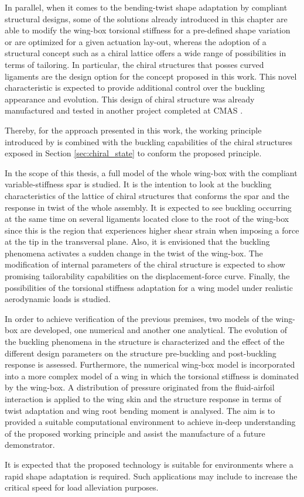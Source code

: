  In parallel, when it comes to the bending-twist shape adaptation by compliant structural designs, some of the solutions already introduced in this chapter are able to modify the wing-box torsional stiffness for a pre-defined shape variation or are optimized for a given actuation lay-out, whereas the adoption of a structural concept such as a chiral lattice offers a wide range of possibilities in terms of tailoring. In particular, the chiral structures that posses curved ligaments are the design option for the concept proposed in this work. This novel characteristic is expected to provide additional control over the buckling appearance and evolution. This design of chiral structure was already manufactured and tested in another project completed at CMAS \cite{Vincenz2017}.

  Thereby, for the approach presented in this work, the working principle introduced by \cite{Raither2013a} is combined with the buckling capabilities of the chiral structures exposed in Section \ref{sec:chiral_state} to conform the proposed principle. 

  In the scope of this thesis, a full model of the whole wing-box with the compliant variable-stiffness spar is studied. It is the intention to look at the buckling characteristics of the lattice of chiral structures that conforms the spar and the response in twist of the whole assembly. It is expected to see buckling occurring at the same time on several ligaments located close to the root of the wing-box since this is the region that experiences higher shear strain when imposing a force at the tip in the transversal plane. Also, it is envisioned that the buckling phenomena activates a sudden change in the twist of the wing-box. The modification of internal parameters of the chiral structure is expected to show promising tailorability capabilities on the displacement-force curve. Finally, the possibilities of the torsional stiffness adaptation for a wing model under realistic aerodynamic loads is studied.

  In order to achieve verification of the previous premises, two models of the wing-box are developed, one numerical and another one analytical. The evolution of the buckling phenomena in the structure is characterized and the effect of the different design parameters on the structure pre-buckling and post-buckling response is assessed. Furthermore, the numerical wing-box model is incorporated into a more complex model of a wing in which the torsional stiffness is dominated by the wing-box. A distribution of pressure originated from the fluid-airfoil interaction is applied to the wing skin and the structure response in terms of twist adaptation and wing root bending moment is analysed. The aim is to provided a suitable computational environment to achieve in-deep understanding of the proposed working principle and assist the manufacture of a future demonstrator.

  It is expected that the proposed technology is suitable for environments where a rapid shape adaptation is required. Such applications may include to increase the critical speed for load alleviation purposes.

